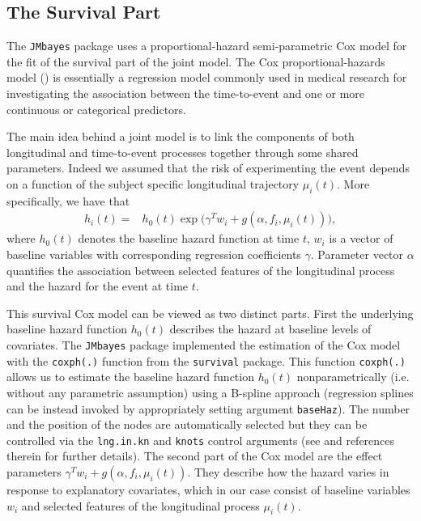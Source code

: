 \documentclass[12pt]{article}
\begin{document}
\subsection{The Survival Part}
\label{Survival submodels}

The \texttt{JMbayes} package uses a proportional-hazard semi-parametric Cox model for the fit of the survival part of the joint model. The Cox proportional-hazards model (\cite{cox1972}) is essentially a regression model commonly used in medical research for investigating the association between the time-to-event and one or more continuous or categorical predictors.

The main idea behind a joint model is to link the components of both longitudinal and time-to-event processes together through some shared parameters. 
Indeed we assumed that the risk of experimenting the event depends on a function of the subject specific longitudinal trajectory $\mu_i(t)$. More specifically, we have that
\begin{equation}
\begin{split}
h_i(t) = &h_0 (t) \exp \big(\gamma^T w_i +g(\alpha, f_i, \mu_i(t))\big),
\end{split}
\label{Survival model1}
\end{equation}
where $h_0 (t)$ denotes the baseline hazard function at time $t$, $w_i$ is a vector of baseline variables with corresponding regression coefficients $\gamma$. Parameter vector $\alpha$ quantifies the association between selected features of the longitudinal process and the hazard for the event at time $t$. 

This survival Cox model can be viewed as two distinct parts. First the underlying baseline hazard function $h_0 (t)$ describes the hazard at baseline levels of covariates. The \texttt{JMbayes} package implemented the estimation of the Cox model with the \texttt{coxph(.)} function from the \texttt{survival} package. This function \texttt{coxph(.)} allows us to estimate the baseline hazard function $h_0 (t)$ nonparametrically (i.e. without any parametric assumption) using a B-spline approach (regression splines can be instead invoked by appropriately setting argument \texttt{baseHaz}). The number and the position of the nodes are automatically selected but they can be controlled via the \texttt{lng.in.kn} and \texttt{knots} control arguments (see \cite{JMbayes} and references therein for further details). The second part of the Cox model are the effect parameters $\gamma^T w_i +g(\alpha, f_i, \mu_i(t))$. They describe how the hazard varies in response to explanatory covariates, which in our case consist of baseline variables $w_i$ and selected features of the longitudinal process $\mu_i(t)$. 
\end{document}
